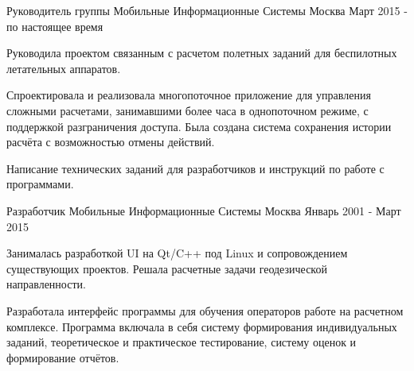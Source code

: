 

\begin{cventries}

  \cventry
    {Руководитель группы} %
    {Мобильные Информационные Системы} %
    {Москва} %
    {Март 2015 - по настоящее время} %
    {
      \begin{cvitems} %
        \item {Руководила проектом связанным с расчетом полетных заданий для беспилотных летательных аппаратов.}
        \item {Спроектировала и реализовала многопоточное приложение для управления сложными расчетами, занимавшими более часа в однопоточном режиме, с поддержкой разграничения доступа. Была создана система сохранения истории расчёта с возможностью отмены действий.}
        \item {Написание технических заданий для разработчиков и инструкций по работе с программами.}
      \end{cvitems}
    }
  \cventry
    {Разработчик} %
    {Мобильные Информационные Системы} %
    {Москва} %
    {Январь 2001 - Март 2015} %
    {
      \begin{cvitems} %
        \item {Занималась разработкой UI на Qt/C++ под Linux и сопровождением существующих проектов. Решала расчетные задачи геодезической направленности.}
        \item {Разработала интерфейс программы для обучения операторов работе на расчетном комплексе. Программа включала в себя систему формирования индивидуальных заданий, теоретическое и практическое тестирование, систему оценок и формирование отчётов.}
      \end{cvitems}
    }    

\end{cventries}
